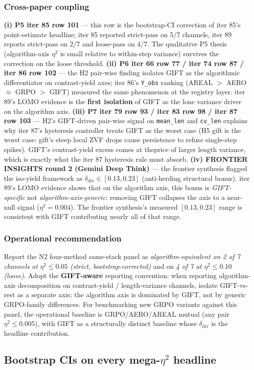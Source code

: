 \documentclass{article}  \usepackage[preprint,nonatbib]{neurips_2026} \usepackage[numbers]{natbib}
\begin{document}
\subsubsection{Cross-paper coupling}
\label{sec:p5-iter89-coupling}
\textbf{(i) P5 iter 85 row 101} --- this row is the bootstrap-CI
correction of iter 85's point-estimate headline; iter 85 reported
strict-pass on 5/7 channels, iter 89 reports strict-pass on 2/7
and loose-pass on 4/7. The qualitative P5 thesis (algorithm-axis
$\eta^2$ is small relative to within-step variance) survives the
correction on the loose threshold.
\textbf{(ii) P6 iter 66 row 77 / iter 74 row 87 / iter 86 row 102} ---
the H2 pair-wise finding isolates GIFT as the algorithmic
differentiator on contrast-yield axes; iter 86's \texttt{Y\_obs}
ranking (AREAL $>$ AERO $\approx$ GRPO $>$ GIFT) measured the same
phenomenon at the registry layer. iter 89's LOMO evidence is the
\textbf{first isolation} of GIFT as the lone variance driver on the
algorithm axis.
\textbf{(iii) P7 iter 79 row 93 / iter 83 row 98 / iter 87 row 103} ---
H2's GIFT-driven pair-wise signal on \texttt{mean\_len} and
\texttt{cv\_len} explains why iter 87's hysteresis controller treats
GIFT as the worst case (H5 gift is the worst case: gift's steep
local ZVF drops cause persistence to refuse single-step spikes).
GIFT's contrast-yield excess comes at theprice of larger length
variance, which is exactly what the iter 87 hysteresis rule must
absorb.
\textbf{(iv) FRONTIER INSIGHTS round 2 (Gemini Deep Think)} ---
the frontier synthesis flagged the iso-yield framework as
$\delta_{\mathrm{div}} \in [0.13, 0.23]$ (anti-herding structural
bonus). iter 89's LOMO evidence shows that on the algorithm axis,
this bonus is \emph{GIFT-specific} not \emph{algorithm-axis-generic}:
removing GIFT collapses the axis to a near-null signal
($\eta^2{=}0.004$). The frontier synthesis's measured $[0.13,
0.23]$ range is consistent with GIFT contributing nearly all of
that range.

\subsubsection{Operational recommendation}
\label{sec:p5-iter89-op}
Report the N2 four-method same-stack panel as
\emph{algorithm-equivalent on 2 of 7 channels at $\eta^2 \leq 0.05$
(strict, bootstrap-corrected)} and on \emph{4 of 7 at
$\eta^2 \leq 0.10$ (loose)}. Adopt the \textbf{GIFT-aware}
reporting convention: when reporting algorithm-axis decomposition
on contrast-yield / length-variance channels, isolate GIFT-vs-rest
as a separate axis; the algorithm axis is dominated by GIFT, not
by generic GRPO-family differences. For benchmarking new GRPO
variants against this panel, the operational baseline is
GRPO/AERO/AREAL mutual (any pair $\eta^2 \leq 0.005$), with GIFT
as a structurally distinct baseline whose $\delta_{\mathrm{div}}$
is the headline contribution. \subsection{Bootstrap CIs on every mega-$\eta^2$ headline}
\label{sec:p5-iter93-mega-eta2-bootstrap}
\end{document}
